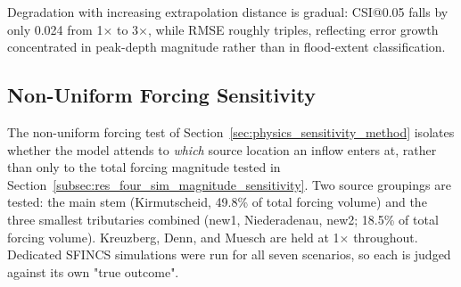 \documentclass[12pt,a4paper]{report}
\begin{document}
{Degradation with increasing extrapolation distance is gradual: CSI@0.05
falls by only 0.024 from 1$\times$ to 3$\times$, while RMSE roughly triples, reflecting
error growth concentrated in peak-depth magnitude rather than in flood-extent
classification.
 
\subsection{Non-Uniform Forcing Sensitivity}
\label{subsec:res_four_sim_sensitivity}
 
The non-uniform forcing test of Section~\ref{sec:physics_sensitivity_method} isolates
whether the model attends to \emph{which} source location an inflow enters at, rather
than only to the total forcing magnitude tested in
Section~\ref{subsec:res_four_sim_magnitude_sensitivity}. Two source groupings are tested: the main stem
(Kirmutscheid, 49.8\% of total forcing volume) and the three smallest tributaries
combined (new1, Niederadenau, new2; 18.5\% of total forcing volume). Kreuzberg,
Denn, and Muesch are held at 1$\times$ throughout.
Dedicated SFINCS simulations were run for all seven scenarios, so each is judged
against its own "true outcome".
 
\begin{table}[H]
  \centering
  \caption{Non-uniform BC sensitivity test, four-simulation model, each scenario against its own dedicated SFINCS ground truth.
    ``Lag'' is the model's peak-timing error in hours (positive = predicted peak
    arrives late).}
  \label{tab:foursim-blockbc}
\end{table}
 
}
\end{document}
